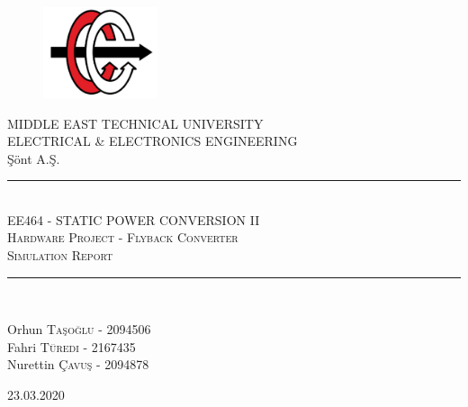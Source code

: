 \begin{titlepage}
\newcommand{\HRule}{\rule{\linewidth}{0.5mm}}
\setlength{\topmargin}{0 in}
\begin{center}

\begin{figure}[!h]
\centering
\includegraphics [width=0.3\textwidth]{eelogo.png}
\end{figure}

\vspace{10mm}
\Huge{MIDDLE EAST TECHNICAL UNIVERSITY}\\
\vspace{5mm}
{\LARGE ELECTRICAL \& ELECTRONICS ENGINEERING}\\
\vspace{4mm}
\LARGE{Şönt A.Ş.}\\

\HRule\\[0.4cm]
\textsc{\Large{EE464 - STATIC POWER CONVERSION II}}\\
\textsc{\Large{Hardware Project - Flyback Converter\\}}
\textsc{\Large{Simulation Report\\}}
\HRule\\[0.4cm]

\vspace{3mm}

\end{center}
\begin{minipage}{1\textwidth}
		\begin{flushleft}
			\large
			Orhun  \textsc{Taşoğlu - 2094506}\\
			Fahri \textsc{Türedi - 2167435}\\
			Nurettin \textsc{Çavuş - 2094878}
			
		\end{flushleft}
	\end{minipage}

\vspace{10mm}
\begin{center}
\large{23.03.2020}
\end{center}
\end{titlepage}